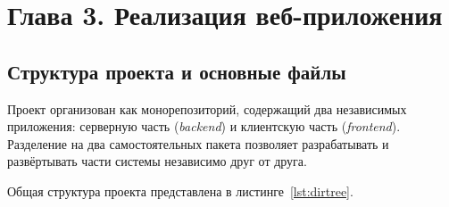 \section*{Глава 3. Реализация веб-приложения}

\subsection{Структура проекта и основные файлы}

Проект организован как монорепозиторий, содержащий два независимых
приложения: серверную часть (\textit{backend}) и клиентскую часть
(\textit{frontend}). Разделение на два самостоятельных пакета позволяет
разрабатывать и развёртывать части системы независимо друг от друга.

Общая структура проекта представлена в листинге~\ref{lst:dirtree}.

